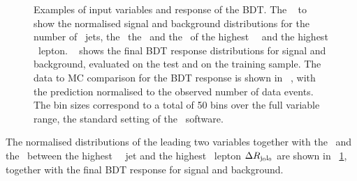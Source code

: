 \begin{figure}[tbp!]
{  \label{sfig:bdtdRj0l0}
}
\hfill
{}
%
\caption[Input variables and response of the \gls{BDT}]{
%
Examples of input variables and response of the \gls{BDT}.
%
The ~ to  show the normalised signal and background distributions for the number of \btagged\ jets, the \mttwo\ the \ptlb\ and the \dR\ of the highest \pt\ \bjet\ and the highest \pt\ lepton.
%
\Fig~ shows the final \gls{BDT} response distributions for signal and background, evaluated on the test and on the training sample.
%
The data to \gls{MC} comparison for the \gls{BDT} response is shown in \fig~, with the prediction normalised to the observed number of data events.
%
The bin sizes correspond to a total of 50 bins over the full variable range, the standard setting of the \TMVA\ software.
%
\label{fig:bdtvars}}
\end{figure}
%
The normalised distributions of the leading two variables together with the \ptlb\ and the \dR\ between the highest \pt\ \btagged\ jet and the highest \pt\ lepton $\Delta R_\mathrm{j_0l_0}$ are shown in \fig~\ref{fig:bdtvars}, together with the final \gls{BDT} response for signal and background. 
